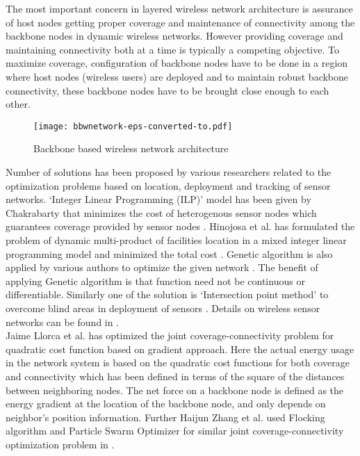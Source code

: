 \documentclass[11pt]{article}
\numberwithin{equation}{section}
\begin{document}
The most important concern in layered wireless network architecture is assurance of host nodes getting proper coverage and maintenance of connectivity among the backbone nodes in dynamic wireless networks. However providing coverage and maintaining connectivity both at a time is typically a competing objective. To maximize coverage, configuration of backbone nodes have to be done in a region where host nodes (wireless users) are deployed and to maintain robust backbone connectivity, these backbone nodes have to be brought close enough to each other. \\
\begin{figure*}[htb!]
\begin{center}
\texttt{[image: bbwnetwork-eps-converted-to.pdf]}
\end{center}
\caption{Backbone based wireless network architecture \cite{lk}}\label{f16}
\end{figure*}
Number of solutions has been proposed by various researchers related to the optimization problems based on location, deployment and tracking of sensor networks\cite{mkt,skm}. `Integer Linear Programming (ILP)' model has been given by Chakrabarty that minimizes the cost of heterogenous sensor nodes which guarantees coverage provided by sensor nodes \cite{ci}. Hinojosa et al. has formulated the problem of dynamic multi-product of facilities location in a mixed integer linear programming model and  minimized the total cost \cite{hpf}. Genetic algorithm is also applied by various authors to optimize the given network \cite{ak,nh}. The benefit of applying Genetic algorithm  is that function need not be continuous or differentiable. Similarly one of the solution is `Intersection point method' to overcome blind areas in deployment of sensors \cite{ab}. Details on wireless sensor networks can be found in \cite{ck,kd,mh,kn,sm,gk}.\\

Jaime Llorca et al.\cite{lk}  has optimized the joint coverage-connectivity problem  for quadratic cost function based on gradient approach. Here the actual energy usage in the network system is based on the quadratic cost functions for both coverage and connectivity which has been defined in terms of the square of the distances between neighboring nodes. The net force on a backbone node is defined as the energy gradient at the location of the backbone node, and only depends on neighbor's position information. Further Haijun Zhang et al. used Flocking algorithm and Particle Swarm Optimizer for similar joint coverage-connectivity optimization problem in \cite{haijun}.\\
\end{document}
